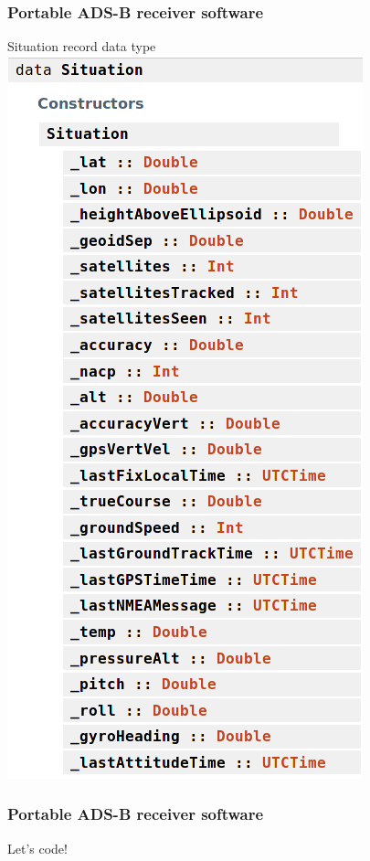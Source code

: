 \begin{frame}
\frametitle{Portable ADS-B receiver software}
\begin{block}{Situation record data type}
\includegraphics[height=0.6\textheight]{image/stratux-situation-record.png}
\end{block}
\end{frame}

\begin{frame}
\frametitle{Portable ADS-B receiver software}
\begin{center}
Let's code!
\end{center}
\end{frame}
